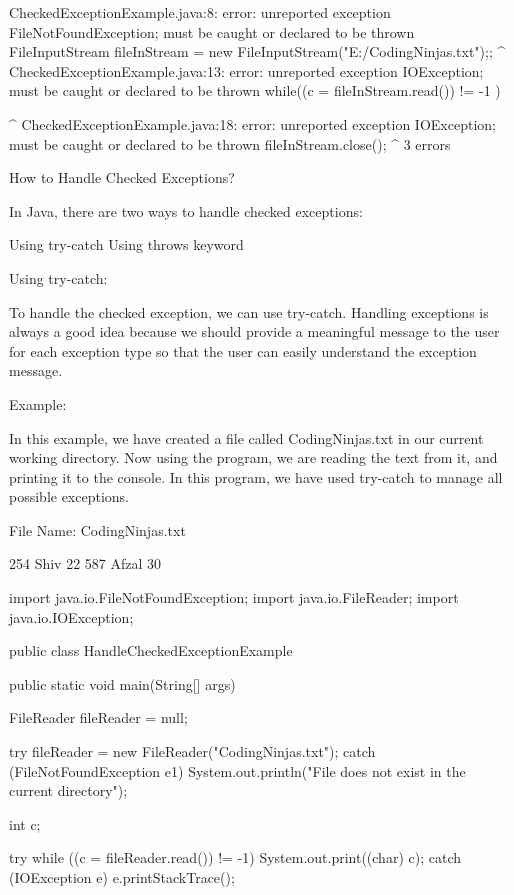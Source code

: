 CheckedExceptionExample.java:8: error: unreported exception FileNotFoundException; must be caught or declared to be thrown
                FileInputStream fileInStream = new FileInputStream("E:/CodingNinjas.txt");;
                                               ^
CheckedExceptionExample.java:13: error: unreported exception IOException; must be caught or declared to be thrown
                while((c = fileInStream.read()) != -1 ){
                                            ^
CheckedExceptionExample.java:18: error: unreported exception IOException; must be caught or declared to be thrown
                fileInStream.close();
                                  ^
3 errors
 

 

How to Handle Checked Exceptions?
 

In Java, there are two ways to handle checked exceptions: 

Using try-catch
Using throws keyword
 

Using try-catch:
 

To handle the checked exception, we can use try-catch. Handling exceptions is always a good idea because we should provide a meaningful message to the user for each exception type so that the user can easily understand the exception message.

 

Example:
 

In this example, we have created a file called CodingNinjas.txt in our current working directory. Now using the program, we are reading the text from it, and printing it to the console. In this program, we have used try-catch to manage all possible exceptions.

 

File Name: CodingNinjas.txt

254 Shiv 22
587 Afzal 30
 

import java.io.FileNotFoundException;
import java.io.FileReader;
import java.io.IOException;

public class HandleCheckedExceptionExample {

    public static void main(String[] args) {
        FileReader fileReader = null;

        try {
            fileReader = new FileReader("CodingNinjas.txt");
        } catch (FileNotFoundException e1) {
            System.out.println("File does not exist in the current directory");
        }

        int c;

        try {
            while ((c = fileReader.read()) != -1) {
                System.out.print((char) c);
            }
        } catch (IOException e) {
            e.printStackTrace();
        }
    }
}
 

}
